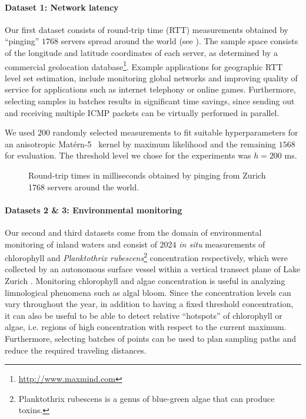 \paragraph{Dataset 1: Network latency}
Our first dataset consists of round-trip time (RTT) measurements obtained
by ``pinging'' $1768$ servers spread around the world (see ).
The sample space consists of the longitude and latitude coordinates of each
server, as determined by a commercial geolocation
database\footnote{\url{http://www.maxmind.com}}.
Example applications for geographic RTT level set estimation, include
monitoring global networks and improving quality of service for applications
such as internet telephony or online games. Furthermore,
selecting samples in batches results in significant time savings, since
sending out and receiving multiple ICMP packets can be virtually performed in
parallel.

We used $200$ randomly selected measurements to fit suitable hyperparameters for
an anisotropic Mat\'{e}rn-5~\mbox{\cite{rasmussen06}} kernel by maximum
likelihood  and the remaining $1568$ for evaluation.
The threshold level we chose for the experiments was $h = 200$ ms.

%
\begin{figure}[tb]
  \centering
  \caption{Round-trip times in milliseconds obtained by pinging from Zurich
           1768 servers around the world.}
  \label{fig:map}
\end{figure}

\paragraph{Datasets 2 \& 3: Environmental monitoring}
Our second and third datasets come from the domain of environmental monitoring
of inland
waters and consist of $2024$ \emph{in situ} measurements of chlorophyll
and \emph{Planktothrix rubescens}\footnote{Planktothrix rubescens is a genus of
blue-green algae that can produce toxins.}
concentration respectively, which were collected by an autonomous surface
vessel within a vertical transect plane of Lake Zurich \cite{hitz12}.
Monitoring chlorophyll and algae concentration is useful in analyzing
limnological phenomena such as algal bloom. Since the concentration levels can
vary throughout the year, in addition to having a fixed threshold
concentration, it can also be useful to be able to detect
relative ``hotspots'' of chlorophyll or algae, i.e. regions of high
concentration with respect to the current maximum. Furthermore, selecting
batches of points can be used to plan sampling paths and reduce the required
traveling distances.

